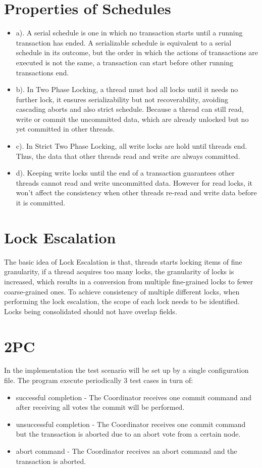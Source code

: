 \documentclass[a4paper, 14pt]{article}
\begin{document}
\section{Properties of Schedules}
\begin{itemize}
\item a). A serial schedule is one in which no transaction starts until a running transaction has ended. A serializable schedule is equivalent to a serial schedule in its outcome, but the order in which the actions of transactions are executed is not the same, a transaction can start before other running transactions end.
\item b). In Two Phase Locking, a thread must hod all locks until it needs no further lock, it ensures serializability but not recoverability, avoiding cascading aborts and also strict schedule. Because a thread can still read, write or commit the uncommitted data, which are already unlocked but no yet committed in other threads.
\item c). In Strict Two Phase Locking, all write locks are hold until threads end. Thus, the data that other threads read and write are always committed.
\item d). Keeping write locks until the end of a transaction guarantees other threads cannot read and write uncommitted data. However for read locks, it won't affect the consistency when other threads re-read and write data before it is committed.
\end{itemize}

\section{Lock Escalation}
The basic idea of Lock Escalation is that, threads starts locking items of fine granularity, if a thread acquires too many locks, the granularity of locks is increased, which results in a conversion from multiple fine-grained locks to fewer coarse-grained ones. 
To achieve consistency of multiple different locks, when performing the lock escalation, the scope of each lock needs to be identified. Locks being consolidated should not have overlap fields.

\section{2PC}
In the implementation the test scenario will be set up by a single configuration file. The program execute periodically 3 test cases in turn of:
\begin{itemize}
\item successful completion - The Coordinator receives one commit command and after receiving all votes the commit will be performed.
\item unsuccessful completion - The Coordinator receives one commit command but the transaction is aborted due to an abort vote from a certain node.
\item abort command - The Coordinator receives an abort command and the transaction is aborted.
\end{itemize}

%
\end{document}
